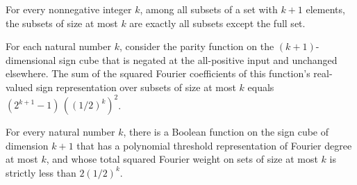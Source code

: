 \begin{theorem}
\label{FABL.lowDegreeFrequencies_eq_erase_univ}
\leanok
{}
For every nonnegative integer $k$, among all subsets of a set with $k+1$ elements, the
subsets of size at most $k$ are exactly all subsets except the full set.
\end{theorem}

\begin{theorem}
\label{FABL.fourierWeightAtMost_onePointFlippedParity}
\leanok
{}
For each natural number $k$, consider the parity function on the $(k+1)$-dimensional
sign cube that is negated at the all-positive input and unchanged elsewhere. The sum of
the squared Fourier coefficients of this function's real-valued sign representation over
subsets of size at most $k$ equals $(2^{k+1}-1)\,((1/2)^k)^2$.
\end{theorem}

\begin{theorem}
\label{FABL.exists_polynomialThreshold_fourierWeightAtMost_lt_two_mul_invPow}
\leanok
{}
For every natural number $k$, there is a Boolean function on the sign cube of dimension
$k+1$ that has a polynomial threshold representation of Fourier degree at most $k$, and
whose total squared Fourier weight on sets of size at most $k$ is strictly less than
$2(1/2)^k$.
\end{theorem}
